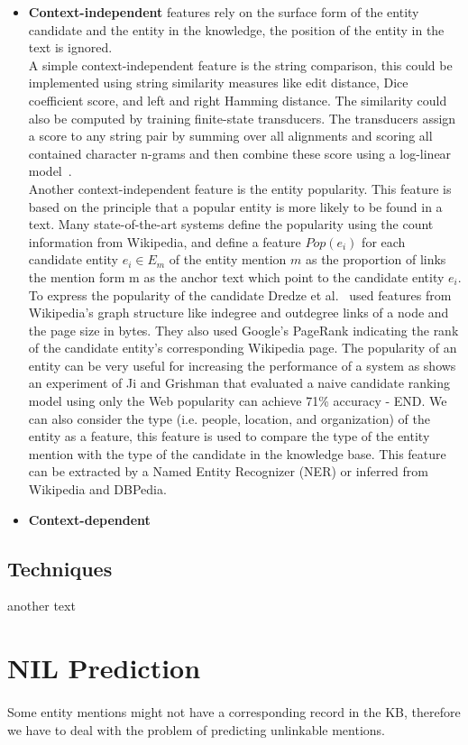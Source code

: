 \begin{itemize}[topsep=10pt]
\item \textbf{Context-independent} features rely on the surface form of the entity candidate and the entity in the knowledge, the position of the entity in the text is ignored. \\
\newline
A simple context-independent feature is the string comparison, this could be implemented using string similarity measures like edit distance, Dice coefficient score, and left and right Hamming distance. The similarity could also be computed by training finite-state transducers. The transducers assign a score to any string pair by summing over all alignments and scoring all contained character n-grams and then combine these score using a log-linear model~\cite{dredze2010entity}.\\
\newline
Another context-independent feature is the entity popularity. This feature is based on the principle that a popular entity is more likely to be found in a text. Many state-of-the-art systems define the popularity using the count information from Wikipedia, and define a feature $Pop(e_i)$ for each candidate entity $e_i \in E_m$ of the entity mention $m$ as the proportion of links the mention form m as the anchor text which point to the candidate entity $e_i$. To express the popularity of the candidate Dredze et al.~\cite{dredze2010entity} used features from Wikipedia's graph structure like indegree and outdegree links of a node and the page size in bytes. They also used Google's PageRank indicating the rank of the candidate entity's corresponding Wikipedia page. The popularity of an entity can be very useful for increasing the performance of a system as shows an experiment of Ji and Grishman that evaluated a naive candidate ranking model using only the Web popularity can achieve 71\% accuracy - END.
\newline
We can also consider the type (i.e. people, location, and organization) of the entity as a feature, this feature is used to compare the type of the entity mention with the type of the candidate in the knowledge base. This feature can be extracted by a Named Entity Recognizer (NER) or inferred from Wikipedia and DBPedia.

\item \textbf{Context-dependent} 
\end{itemize}

\subsection{Techniques}
another text

\section{NIL Prediction}
\paragraph{}
Some entity mentions might not have a corresponding record in the KB, therefore we have to deal with the problem of predicting unlinkable mentions. 